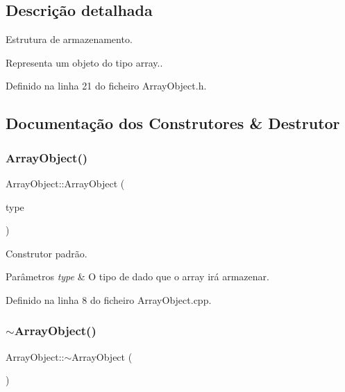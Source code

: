 \subsection{Descrição detalhada}
Estrutura de armazenamento. 

Representa um objeto do tipo array.. 

Definido na linha 21 do ficheiro Array\+Object.\+h.



\subsection{Documentação dos Construtores \& Destrutor}
\mbox{\label{classArrayObject_afd91a9df894ad32f51e40da74de7f2c4}} 
\subsubsection{\texorpdfstring{Array\+Object()}{ArrayObject()}}
{\footnotesize\ttfamily Array\+Object\+::\+Array\+Object (\begin{DoxyParamCaption}\item[{\hyperlink{BasicTypes_8h_ad9971b6ef33e02ba2c75d19c1d2518a1}{Value\+Type}}]{type }\end{DoxyParamCaption})}



Construtor padrão. 


\begin{DoxyParams}{Parâmetros}
{\em type} & O tipo de dado que o array irá armazenar. \\
\hline
\end{DoxyParams}


Definido na linha 8 do ficheiro Array\+Object.\+cpp.

\mbox{\label{classArrayObject_a91c9426247002224d484c32883ff51b1}} 
\subsubsection{\texorpdfstring{$\sim$\+Array\+Object()}{~ArrayObject()}}
{\footnotesize\ttfamily Array\+Object\+::$\sim$\+Array\+Object (\begin{DoxyParamCaption}{ }\end{DoxyParamCaption})}



